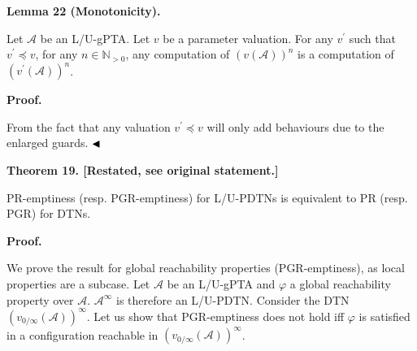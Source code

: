 \par\medskip\noindent\textbf{Lemma 22 (Monotonicity).}\par
 
 
Let $\mathcal{A}$ be an L/U-gPTA. Let $v$ be a parameter valuation. For any $v^{\prime}$ such that $v^{\prime}\preceq v$, for any $n\in\mathbb{N}_{>0}$, any computation of ${(v(\mathcal{A}))}^{n}$ is a computation of ${(v^{\prime}(\mathcal{A}))}^{n}$.\par
 
 
 
 
\par\medskip\noindent\textbf{Proof.}\par
 
 
From the fact that any valuation $v^{\prime}\preceq v$ will only add behaviours due to the enlarged guards. $\hfill\blacktriangleleft$\par
 
 
 
 
\par\medskip\noindent\textbf{Theorem 19. [Restated, see original statement.]}\par
 
 
PR-emptiness (resp. PGR-emptiness) for L/U-PDTNs is equivalent to PR (resp. PGR) for DTNs.\par
 
 
 
 
 
 
\par\medskip\noindent\textbf{Proof.}\par
 
 
We prove the result for global reachability properties (PGR-emptiness), as local properties are a subcase. Let $\mathcal{A}$ be an L/U-gPTA and $\varphi$ a global reachability property over $\mathcal{A}$. ${\mathcal{A}}^{\infty}$ is therefore an L/U-PDTN. Consider the DTN ${(v_{0/\infty}(\mathcal{A}))}^{\infty}$. Let us show that PGR-emptiness does not hold iff $\varphi$ is satisfied in a configuration reachable in ${(v_{0/\infty}(\mathcal{A}))}^{\infty}$.\par
 
